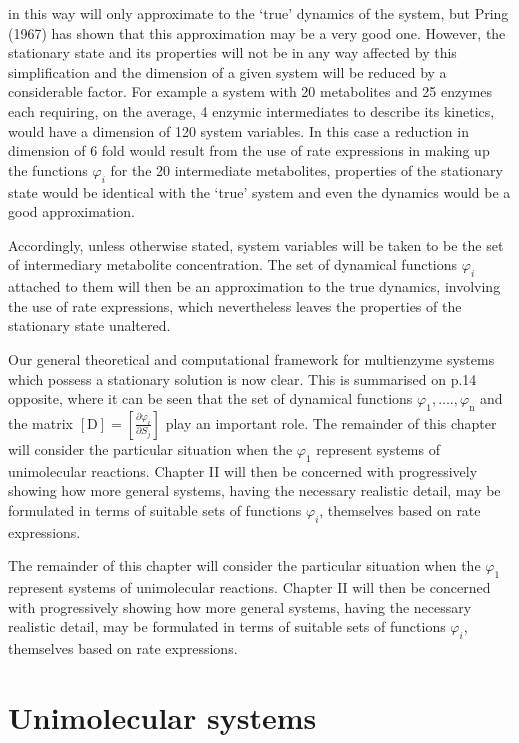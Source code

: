 in this way will only approximate to the `true' dynamics of the system, but Pring (1967) has shown that this approximation may be a very good one. However, the stationary state and its properties will not be in any way affected by this simplification and the dimension of a given system will be reduced by a considerable factor. For example a system with 20 metabolites and 25 enzymes each requiring, on the average, 4 enzymic intermediates to describe its kinetics, would have a dimension of 120 system variables. In this case a reduction in dimension of 6 fold would result from the use of rate expressions in making up the functions $\varphi_{i}$ for the 20 intermediate metabolites, properties of the stationary state would be identical with the `true' system and even the dynamics would be a good approximation.

Accordingly, unless otherwise stated, system variables will be taken to be the set of intermediary metabolite concentration. The set of dynamical functions $\varphi_{i}$ attached to them will then be an approximation to the true dynamics, involving the use of rate expressions, which nevertheless leaves the properties of the stationary state unaltered.

Our general theoretical and computational framework for multienzyme systems which possess a stationary solution is now clear. This is summarised on p.14 opposite, where it can be seen that the set of dynamical functions $\varphi_{1}, \ldots ., \varphi_{\mathrm{n}}$ and the matrix $[\mathrm{D}]=\left[\frac{\partial \varphi_{i}}{\partial S_{j}}\right]$ play an important role. The remainder of this chapter will consider the particular situation when the $\varphi_{1}$ represent systems of unimolecular reactions. Chapter II will then be concerned with progressively showing how more general systems, having the necessary realistic detail, may be formulated in terms of suitable sets of functions $\varphi_{i}$, themselves based on rate expressions.

The remainder of this chapter will consider the particular situation when the $\varphi_1$ represent systems of unimolecular reactions. Chapter II will then be concerned with progressively showing how more general systems, having the necessary realistic detail, may be formulated in terms of suitable sets of functions $\varphi_i$, themselves based on rate expressions.

\section{Unimolecular systems}


